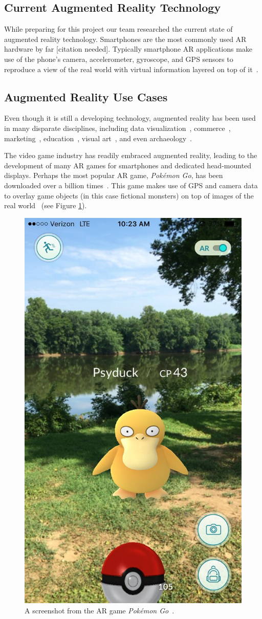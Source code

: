 \documentclass[a4paper, 10pt, american, titlepage]{article}
\begin{document}
\subsection{Current Augmented Reality Technology}
\label{sec:currentAugmentedRealityTechnology}

While preparing for this project our team researched the current state of
augmented reality technology. Smartphones are the most commonly used AR
hardware by far [citation needed]. Typically smartphone AR applications make
use of the phone's camera, accelerometer, gyroscope, and GPS sensors to
reproduce a view of the real world with virtual information layered on top of
it~\autocite{bonsor2018}.

\subsection{Augmented Reality Use Cases}
\label{sec:augmentedRealityUseCases}

Even though it is still a developing technology, augmented reality has been used
in many disparate disciplines, including data
visualization~\autocite{resnick2017}, commerce~\autocite{matney2018},
marketing~\autocite{sharma2015}, education~\autocite{stewart-smith2012}, visual
art~\autocite{katz2018}, and even archaeology~\autocite{eve2012}.

The video game industry has readily embraced augmented reality, leading to the
development of many AR games for smartphones and dedicated head-mounted
displays. Perhaps the most popular AR game, \textit{Pokémon Go}, has been
downloaded over a billion times~\autocite{webster2018}. This game makes use of
GPS and camera data to overlay game objects (in this case fictional monsters) on
top of images of the real world~\autocite{concepcion2016} (see Figure
\ref{fig:pokemonGo}).

\begin{figure}[h]
	\centering
	\includegraphics[width=.5\textwidth]{pokemon-go.jpg}
	\caption[A screenshot from the AR game \textit{Pokémon Go}]{A screenshot
		from the AR game \textit{Pokémon Go}~\autocite{vastateparks2016}.}
	\label{fig:pokemonGo}
\end{figure}
\end{document}
